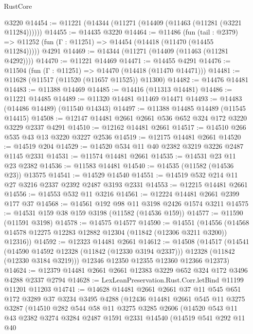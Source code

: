\begin{lexlean}{RustCore}
\begin{coremodule}
    @3220
@14454 := @11221 (@14344 (@11271 (@14409 (@11463 (@11281 (@3221 @11284))))))
@14455 := @14435 @3220
@14464 := @11486
    (fun (tail : @2379) => @11252 (fun (Γ : @11251) => @14454 (@14418 (@11470 (@14455 @11284)))))
    @4291
@14469 := @14344 (@11271 (@14409 (@11463 (@11281 @4292))))
@14470 := @11221 @14469
@14471 := @14455 @4291
@14476 := @11504 (fun (Γ : @11251) => @14470 (@14418 (@11470 @14471)))
@14481 := @11628 (@11517 (@11520 (@11657 @11525)) @11300)
@14482 := @14476 @14481
@14483 := @11388 @14469
@14485 := @14416 (@11313 @14481)
@14486 := @11221 @14485
@14489 := @11320 @14481 @11469 @14471
@14493 := @14483 (@14486 @14489) (@11540 @14343)
@14497 := @11388 @14485 @14489 (@11545 @14415)
@14508 := @12147 @14481 @2661 @2661 @536 @652 @324 @172 @3220 @3229 @2337 @4291
@14510 := @12162 @14481 @2661
@14517 := @14510 @266 @535 @43 @13 @3220 @3227 @2536
@14519 := @12175 @14481 @2661
@14520 := @14519 @204
@14529 := @14520 @534 @11 @40 @2382 @3219 @3226 @2487 @1145 @2331
@14531 := @11574 @14481 @2661
@14535 := @14531 @23 @11 @23 @2382
@14536 := @11583 @14481
@14540 := @14535 (@11582 (@14536 @23)) @13575
@14541 := @14529 @14540
@14551 := @14519 @532 @214 @11 @27 @3216 @2337 @2392 @2487 @3193 @2331
@14553 := @12215 @14481 @2661
@14556 := @14553 @532 @11 @3216
@14561 := @12224 @14481 @2661 @2399 @177 @37
@14568 := @14561 @192 @98 @11 @3198 @2426 @1574 @3211
@14575 := @14531 @159 @38 @159 @3198 (@11582 (@14536 @159))
@14577 := @11590 (@11591 @3198)
@14578 := @14575 @14577
@14590 := @14551
    (@14556 (@14568 @14578 @12275 @12283 @12882 @12304 (@11842 (@12306 @3211 @3200)) @12316))
@14592 := @12323 @14481 @2661
@14612 := @14508
    (@14517
      (@14541
        (@14590 @14592 @12328 (@11842 (@12330 @3194 @2337)))
        @12328
        (@11842 (@12330 @3184 @3219)))
      @12346
      @12350
      @12355
      @12360
      @12366
      @12373)
@14624 := @12379 @14481 @2661 @2661 @12383 @3229 @652 @324 @172 @3496 @4288 @2337 @2794
@14628 := LexLeanPreservation.Rust.Corr.letBind @11199 @11201 @11203
@14741 := @14628
    @14481
    @2661
    @2661
    @37
    @11
    @545
    @651
    @172
    @3289
    @37
    @3234
    @3495
    @4288
    (@12436
      @14481
      @2661
      @545
      @11
      @3275
      @3287
      (@14510
        @282
        @544
        @58
        @11
        @3275
        @3285
        @2606
        (@14520
          @543
          @11
          @43
          @2382
          @3274
          @3284
          @2487
          @1591
          @2331
          @14540
          (@14519
            @541
            @292
            @11
            @40

\end{coremodule}
\end{lexlean}
